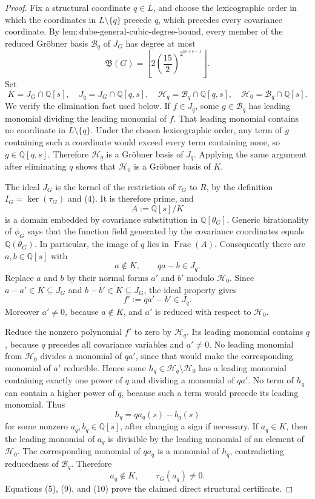 \documentclass{article}
\begin{document}
\begin{proof}
Fix a structural coordinate \(q\in L\), and choose the lexicographic order in which the coordinates in \(L\setminus\{q\}\) precede \(q\), which precedes every covariance coordinate.  By \(\mathrm{lem:dube\mbox{-}general\mbox{-}cubic\mbox{-}degree\mbox{-}bound}\), every member of the reduced Gr\"obner basis \(\mathcal B_q\) of \(J_G\) has degree at most
\[
 \mathfrak B(G)=
 \left\lfloor2\left(\frac{15}{2}\right)^{2^{m+e-1}}\right\rfloor.
 \tag{5}
\]
Set
\[
 K=J_G\cap\mathbb Q[s],
 \quad
 J_q=J_G\cap\mathbb Q[q,s],
 \quad
 \mathcal H_q=\mathcal B_q\cap\mathbb Q[q,s],
 \quad
 \mathcal H_0=\mathcal B_q\cap\mathbb Q[s].
 \tag{6}
\]
We verify the elimination fact used below.  If \(f\in J_q\), some \(g\in\mathcal B_q\) has leading monomial dividing the leading monomial of \(f\).  That leading monomial contains no coordinate in \(L\setminus\{q\}\).  Under the chosen lexicographic order, any term of \(g\) containing such a coordinate would exceed every term containing none, so \(g\in\mathbb Q[q,s]\).  Therefore \(\mathcal H_q\) is a Gr\"obner basis of \(J_q\).  Applying the same argument after eliminating \(q\) shows that \(\mathcal H_0\) is a Gr\"obner basis of \(K\).

The ideal \(J_G\) is the kernel of the restriction of \(\tau_G\) to \(R\), by the definition \(I_G=\ker(\tau_G)\) and (4).  It is therefore prime, and
\[
 A:=\mathbb Q[s]/K
\]
is a domain embedded by covariance substitution in \(\mathbb Q[\theta_G]\).  Generic birationality of \(\phi_G\) says that the function field generated by the covariance coordinates equals \(\mathbb Q(\theta_G)\).  In particular, the image of \(q\) lies in \(\operatorname{Frac}(A)\).  Consequently there are \(a,b\in\mathbb Q[s]\) with
\[
 a\notin K,
 \qquad
 qa-b\in J_q.
 \tag{7}
\]
Replace \(a\) and \(b\) by their normal forms \(a'\) and \(b'\) modulo \(\mathcal H_0\).  Since \(a-a'\in K\subseteq J_G\) and \(b-b'\in K\subseteq J_G\), the ideal property gives
\[
 f':=qa'-b'\in J_q.
 \tag{8}
\]
Moreover \(a'\neq0\), because \(a\notin K\), and \(a'\) is reduced with respect to \(\mathcal H_0\).

Reduce the nonzero polynomial \(f'\) to zero by \(\mathcal H_q\).  Its leading monomial contains \(q\), because \(q\) precedes all covariance variables and \(a'\neq0\).  No leading monomial from \(\mathcal H_0\) divides a monomial of \(qa'\), since that would make the corresponding monomial of \(a'\) reducible.  Hence some \(h_q\in\mathcal H_q\setminus\mathcal H_0\) has a leading monomial containing exactly one power of \(q\) and dividing a monomial of \(qa'\).  No term of \(h_q\) can contain a higher power of \(q\), because such a term would precede its leading monomial.  Thus
\[
 h_q=q a_q(s)-b_q(s)
 \tag{9}
\]
for some nonzero \(a_q,b_q\in\mathbb Q[s]\), after changing a sign if necessary.  If \(a_q\in K\), then the leading monomial of \(a_q\) is divisible by the leading monomial of an element of \(\mathcal H_0\).  The corresponding monomial of \(q a_q\) is a monomial of \(h_q\), contradicting reducedness of \(\mathcal B_q\).  Therefore
\[
 a_q\notin K,
 \qquad
 \tau_G(a_q)\neq0.
 \tag{10}
\]
Equations (5), (9), and (10) prove the claimed direct structural certificate.


\end{proof}
\end{document}
